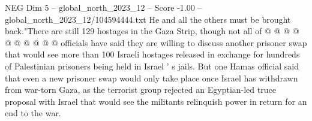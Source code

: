 \begin{textsample}{NEG Dim 5 – global\_north\_2023\_12 – Score -1.00 – global\_north\_2023\_12/104594444.txt}
He and all the others must be brought back."There are still 129 hostages in the Gaza Strip, though not all of @ @ @ @ @ @ @ @ @ @ officials have said they are willing to discuss another prisoner swap that would see more than 100 Israeli hostages released in exchange for hundreds of Palestinian prisoners being held in Israel ' s jails.
But one Hamas official said that even a new prisoner swap would only take place once Israel has withdrawn from war-torn Gaza, as the terrorist group rejected an Egyptian-led truce proposal with Israel that would see the militants relinquish power in return for an end to the war.

\end{textsample}
